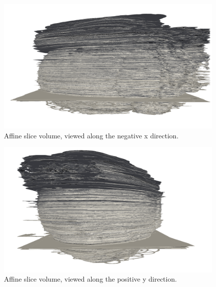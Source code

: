 	\begin{figure}
	  \centering
	  \includegraphics[width=0.9\textheight]{Ch6/Figs/Rat28/contours/whole_negative_x_affine}
	  \caption{Affine slice volume, viewed along the negative x direction.}
	  \label{fig:negative_x_affine_contour}
	\end{figure}

	\begin{figure}
	  \centering
	  \includegraphics[width=0.9\textheight]{Ch6/Figs/Rat28/contours/whole_positive_y_affine}
	  \caption{Affine slice volume, viewed along the positive y direction.}
	  \label{fig:positive_y_affine_contour}
	\end{figure}


